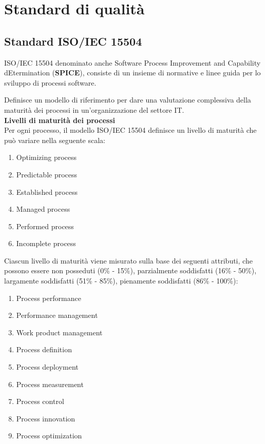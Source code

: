 \section{Standard di qualità} 
	\subsection{Standard ISO/IEC 15504}\label{AppQualitaProcessi}

		ISO/IEC 15504 denominato anche Software Process Improvement and Capability dEtermination (\textbf{SPICE}), consiste di un insieme di normative e linee guida per lo sviluppo di processi software.
	
		Definisce un modello di riferimento per dare una valutazione complessiva della maturità dei processi in un'organizzazione del settore IT.\\
	
		\textbf{Livelli di maturità dei processi}\\

		Per ogni processo, il modello ISO/IEC 15504 definisce un livello di maturità che può variare nella seguente scala:
		
		\begin{enumerate}

			\item Optimizing process
			\item Predictable process
			\item Established process
			\item Managed process
			\item Performed process
			\item Incomplete process

		\end{enumerate}
		
		Ciascun livello di maturità viene misurato sulla base dei seguenti attributi, che possono essere non posseduti (0\% - 15\%), parzialmente soddisfatti (16\% - 50\%), largamente soddisfatti (51\% - 85\%), pienamente soddisfatti (86\% - 100\%):
		
		\begin{enumerate}
		
			\item Process performance
			\item Performance management
			\item Work product management
			\item Process definition
			\item Process deployment
			\item Process measurement
			\item Process control
			\item Process innovation
			\item Process optimization
			
		\end{enumerate}
		
